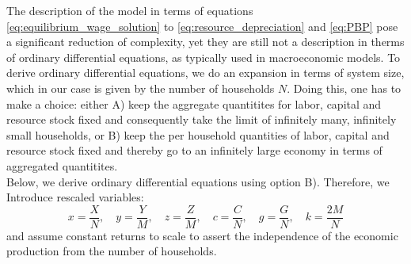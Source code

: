 The description of the model in terms of equations \eqref{eq:equilibrium_wage_solution} to \eqref{eq:resource_depreciation} and \eqref{eq:PBP} pose a significant reduction of complexity, yet they are still not a description in therms of ordinary differential equations, as typically used in macroeconomic models. To derive ordinary differential equations, we do an expansion in terms of system size, which in our case is given by the number of households $N$.
Doing this, one has to make a choice: either A) keep the aggregate quantitites for labor, capital and resource stock fixed and consequently take the limit of infinitely many, infinitely small households, or B) keep the per household quantities of labor, capital and resource stock fixed and thereby go to an infinitely large economy in terms of aggregated quantitites. \\
Below, we derive ordinary differential equations using option B). Therefore, we Introduce rescaled variables:
\begin{equation}
	x = \frac{X}{N}, \quad y = \frac{Y}{M}, \quad z = \frac{Z}{M}, \quad c = \frac{C}{N}, \quad g = \frac{G}{N}, \quad k = \frac{2M}{N}
\end{equation}
and assume constant returns to scale to assert the independence of the economic production from the number of households.

